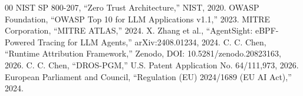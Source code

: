 \documentclass[conference]{IEEEtran}
\begin{document}
\begin{thebibliography}{00}
 NIST SP 800-207, ``Zero Trust Architecture,'' NIST, 2020.
 OWASP Foundation, ``OWASP Top 10 for LLM Applications v1.1,'' 2023.
 MITRE Corporation, ``MITRE ATLAS,'' 2024.
 X. Zhang et al., ``AgentSight: eBPF-Powered Tracing for LLM Agents,'' arXiv:2408.01234, 2024.
 C. C. Chen, ``Runtime Attribution Framework,'' Zenodo, DOI: 10.5281/zenodo.20823163, 2026.
 C. C. Chen, ``DROS-PGM,'' U.S. Patent Application No. 64/111,973, 2026.
 European Parliament and Council, ``Regulation (EU) 2024/1689 (EU AI Act),'' 2024.
\end{thebibliography}
\end{document}
